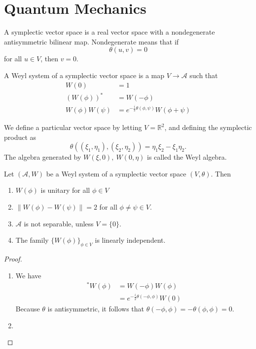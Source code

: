 \documentclass[twoside,symmetric, openany, 12pt]{./tuftebook}
\theoremstyle{definition}
\theoremstyle{definition}
\theoremstyle{definition}
\newcommand{\R}{\mathbb{R}}
\begin{document}
\chapter{Quantum Mechanics}
\begin{Definition}
	A symplectic vector space is a real vector space with a nondegenerate antisymmetric bilinear map. Nondegenerate means that if
	\[
	\theta(u,v)=0
\]
for all $u\in V$, then $v=0$.
\end{Definition}
\begin{Definition}
	A Weyl system of a symplectic vector space is a map $V\to \mathcal{A}$ such that
	\begin{align*}
		W(0) &= 1 \\
		(W(\phi))^* &= W(-\phi) \\
		W(\phi)W(\psi) &= e^{-\frac{i}{2}\theta(\phi,\psi)}W(\phi+\psi) 
	\end{align*}
\end{Definition}
\begin{Definition}
	We define a particular vector space by letting $V=\R^2$, and defining the symplectic product as
	\[
	\theta((\xi_1,\eta_1), (\xi_2, \eta_2) )= \eta_1\xi_2-\xi_1\eta_2
	.\] 
	The algebra generated by $W(\xi, 0),~W(0,\eta)$ is called the Weyl algebra.
\end{Definition}
\begin{Theorem}
	Let $(\mathcal{A},W)$ be a Weyl system of a symplectic vector space $(V,\theta)$. Then
	\begin{enumerate}
		\item $W(\phi)$ is unitary for all $\phi\in V$ 
		\item $\|W(\phi)-W(\psi)\|=2$ for all $\phi\neq\psi \in V$.
		\item $\mathcal{A}$ is not separable, unless $V=\{0\} $.
		\item The family $\{W(\phi)\}_{\phi\in V}$ is linearly independent.
	\end{enumerate}
\end{Theorem}
\begin{proof}
	\begin{enumerate}
		\item We have
			\begin{align*}
				[W(\phi)]^*W(\phi) &= W(-\phi)W(\phi) \\
						   &= e^{-\frac{i}{2}\theta(-\phi,\phi)}W(0) 
			\end{align*}
			Because $\theta$ is antisymmetric, it follows that $\theta(-\phi,\phi) =-\theta(\phi,\phi) = 0$.
		\item 
	\end{enumerate}
\end{proof}
\renewcommand{\listtheoremname}{List of Definitions}
\listoftheorems[ignoreall, onlynamed={Definition}]
\renewcommand{\listtheoremname}{List of Theorems}
\listoftheorems[ignoreall, onlynamed={Theorem}]
\renewcommand{\listtheoremname}{List of Examples}
\listoftheorems[ignoreall, onlynamed={Example}]
\end{document}
